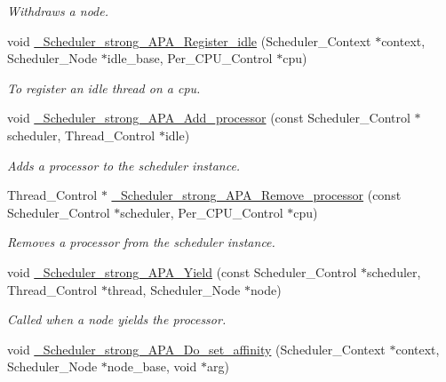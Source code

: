 \begin{DoxyCompactItemize}
\begin{DoxyCompactList}\small\item\em Withdraws a node. \end{DoxyCompactList}\item 
void \hyperlink{group__RTEMSScoreSchedulerStrongAPA_gad0d503dce329bd77203ea47397bb7e9d}{\+\_\+\+Scheduler\+\_\+strong\+\_\+\+A\+P\+A\+\_\+\+Register\+\_\+idle} (Scheduler\+\_\+\+Context $\ast$context, Scheduler\+\_\+\+Node $\ast$idle\+\_\+base, Per\+\_\+\+C\+P\+U\+\_\+\+Control $\ast$cpu)
\begin{DoxyCompactList}\small\item\em To register an idle thread on a cpu. \end{DoxyCompactList}\item 
void \hyperlink{group__RTEMSScoreSchedulerStrongAPA_ga6ac09dac24785561fd7c5ee5bbd8f5ca}{\+\_\+\+Scheduler\+\_\+strong\+\_\+\+A\+P\+A\+\_\+\+Add\+\_\+processor} (const Scheduler\+\_\+\+Control $\ast$scheduler, Thread\+\_\+\+Control $\ast$idle)
\begin{DoxyCompactList}\small\item\em Adds a processor to the scheduler instance. \end{DoxyCompactList}\item 
Thread\+\_\+\+Control $\ast$ \hyperlink{group__RTEMSScoreSchedulerStrongAPA_ga91dc29dcdeea35e3329623be7a798e39}{\+\_\+\+Scheduler\+\_\+strong\+\_\+\+A\+P\+A\+\_\+\+Remove\+\_\+processor} (const Scheduler\+\_\+\+Control $\ast$scheduler, Per\+\_\+\+C\+P\+U\+\_\+\+Control $\ast$cpu)
\begin{DoxyCompactList}\small\item\em Removes a processor from the scheduler instance. \end{DoxyCompactList}\item 
void \hyperlink{group__RTEMSScoreSchedulerStrongAPA_gad6d1206459f21c74882cd2fb3ddd4aae}{\+\_\+\+Scheduler\+\_\+strong\+\_\+\+A\+P\+A\+\_\+\+Yield} (const Scheduler\+\_\+\+Control $\ast$scheduler, Thread\+\_\+\+Control $\ast$thread, Scheduler\+\_\+\+Node $\ast$node)
\begin{DoxyCompactList}\small\item\em Called when a node yields the processor. \end{DoxyCompactList}\item 
void \hyperlink{group__RTEMSScoreSchedulerStrongAPA_ga5a91c9d6e7fbc55bda26161294fb8b6f}{\+\_\+\+Scheduler\+\_\+strong\+\_\+\+A\+P\+A\+\_\+\+Do\+\_\+set\+\_\+affinity} (Scheduler\+\_\+\+Context $\ast$context, Scheduler\+\_\+\+Node $\ast$node\+\_\+base, void $\ast$arg)

\end{DoxyCompactItemize}
